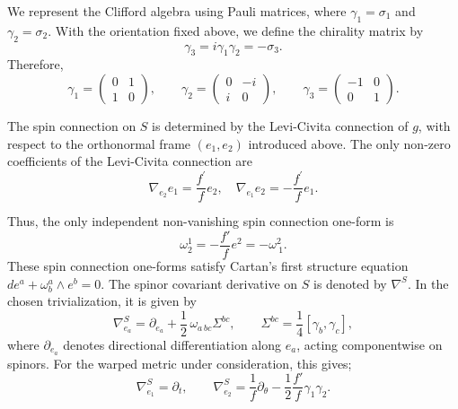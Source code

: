 \documentclass[11pt]{article}
\theoremstyle{definition}
\numberwithin{equation}{section}
\begin{document}
We represent the Clifford algebra using Pauli matrices, where $\gamma_1 = \sigma_1$  and $ \gamma_2 = \sigma_2$. With the orientation fixed above, we define the chirality matrix by
\begin{equation}
\gamma_3 = i \gamma_1 \gamma_2 = - \sigma_3.
\end{equation}
Therefore,
\begin{equation}
\gamma_1 = \begin{pmatrix} 0 & 1 \\ 1 & 0 \end{pmatrix}, \qquad
\gamma_2 = \begin{pmatrix} 0 & -i \\ i & 0 \end{pmatrix}, \qquad
\gamma_3 = \begin{pmatrix} -1 & 0 \\ 0 & 1 \end{pmatrix}.
\end{equation}


The spin connection on $S$ is determined by the Levi-Civita connection of $g$, with respect to the orthonormal frame $( e_1, e_2)$ introduced above. The only non-zero coefficients of the Levi-Civita connection are
\begin{equation}
\nabla_{e_{2}} e_1=  \frac{f^{\prime}}{f}e_2,  \quad  \nabla_{e_1} e_2 = - \frac{f^{\prime}}{f}e_1.
\end{equation}

Thus, the only independent non-vanishing spin connection one-form is
\begin{equation}
\omega^1_{ 2} = -\frac{f'}{f} e^2 = - \omega^2_{\ 1}.
\end{equation}
These spin connection one-forms satisfy Cartan's first structure equation $ d e^{a} + \omega^{a}_{b} \wedge e^{b} = 0$.
The spinor covariant derivative on \(S\) is denoted by \(\nabla^S\). In the chosen trivialization, it is given by
\begin{equation}
\nabla^S_{e_a}=\partial_{e_a}+\frac12\,\omega_{a\,bc}\Sigma^{bc},
\qquad
\Sigma^{bc}=\frac14[\gamma_b,\gamma_c],
\end{equation}
where \(\partial_{e_a}\) denotes directional differentiation along \(e_a\), acting componentwise on spinors. For the warped metric under consideration, this gives;
\begin{equation}
\nabla^S_{e_1} = \partial_t, \qquad \nabla^S_{e_2} = \frac{1}{f}\partial_\theta - \frac{1}{2} \frac{f'}{ f} \gamma_1 \gamma_2.
\end{equation}
\end{document}
